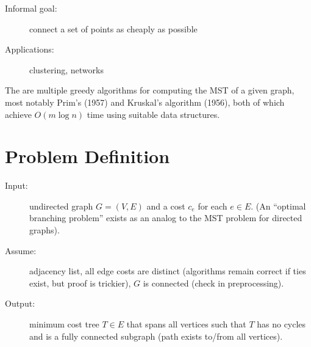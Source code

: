 \documentclass[11pt]{article}
\begin{document}
\begin{description}
	\item[Informal goal:] connect a set of points as cheaply as possible
	\item[Applications:] clustering, networks
\end{description}

The are multiple greedy algorithms for computing the MST of a given graph, most notably Prim's (1957) and Kruskal's algorithm (1956), both of which achieve $O(m\log n)$ time using suitable data structures.

\section{Problem Definition}
	\begin{description}
		\item[Input:] undirected graph $G=(V,E)$ and a cost $c_e$ for each $e\in E$. (An ``optimal branching problem'' exists as an analog to the MST problem for directed graphs).
		\item[Assume:] adjacency list, all edge costs are distinct (algorithms remain correct if ties exist, but proof is trickier), $G$ is connected (check in preprocessing).
		\item[Output:] minimum cost tree $T\in E$ that spans all vertices such that $T$ has no cycles and is a fully connected subgraph (path exists to/from all vertices).
	\end{description}

%		
%		


\end{document}
